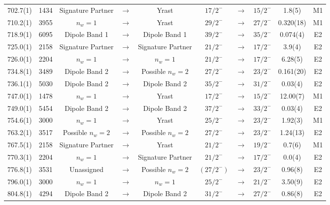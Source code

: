 \begin{landscape}
\begin{center}
\begin{longtable}{|c|c|ccc|ccc|c|c|}
 702.7(1) & 1434 & Signature Partner & $ \rightarrow $ & Yrast & $ 17/2^{-} $ & $ \rightarrow $ & $ 15/2^{-} $ & 1.8(5) & M1 \\
 710.2(1) & 3955 & $n_w=1$ & $ \rightarrow $ & Yrast & $ 29/2^{-} $ & $ \rightarrow $ & $ 27/2^{-} $ & 0.320(18) & M1 \\
 718.9(1) & 6095 & Dipole Band 1 & $ \rightarrow $ & Dipole Band 1 & $ 39/2^{-} $ & $ \rightarrow $ & $ 35/2^{-} $ & 0.074(4) & E2 \\
 725.0(1) & 2158 & Signature Partner & $ \rightarrow $ & Signature Partner & $ 21/2^{-} $ & $ \rightarrow $ & $ 17/2^{-} $ & 3.9(4) & E2 \\
 726.0(1) & 2204 & $n_w=1$ & $ \rightarrow $ & $n_w=1$ & $ 21/2^{-} $ & $ \rightarrow $ & $ 17/2^{-} $ & 6.28(5) & E2 \\
 734.8(1) & 3489 & Dipole Band 2 & $ \rightarrow $ & Possible $n_w=2$ & $ 27/2^{-} $ & $ \rightarrow $ & $ 23/2^{-} $ & 0.161(20) & E2 \\
 736.1(1) & 5030 & Dipole Band 2 & $ \rightarrow $ & Dipole Band 2 & $ 35/2^{-} $ & $ \rightarrow $ & $ 31/2^{-} $ & 0.03(4) & E2 \\
 747.0(1) & 1478 & $n_w=1$ & $ \rightarrow $ & Yrast & $ 17/2^{-} $ & $ \rightarrow $ & $ 15/2^{-} $ & 12.00(7) & M1 \\
 749.0(1) & 5454 & Dipole Band 2 & $ \rightarrow $ & Dipole Band 2 & $ 37/2^{-} $ & $ \rightarrow $ & $ 33/2^{-} $ & 0.03(4) & E2 \\
 754.6(1) & 3000 & $n_w=1$ & $ \rightarrow $ & Yrast & $ 25/2^{-} $ & $ \rightarrow $ & $ 23/2^{-} $ & 1.92(3) & M1 \\
 763.2(1) & 3517 & Possible $n_w=2$ & $ \rightarrow $ & Possible $n_w=2$ & $ 27/2^{-} $ & $ \rightarrow $ & $ 23/2^{-} $ & 1.24(13) & E2 \\
 767.5(1) & 2158 & Signature Partner & $ \rightarrow $ & Yrast & $ 21/2^{-} $ & $ \rightarrow $ & $ 19/2^{-} $ & 0.7(6) & M1 \\
 770.3(1) & 2204 & $n_w=1$ & $ \rightarrow $ & Signature Partner & $ 21/2^{-} $ & $ \rightarrow $ & $ 17/2^{-} $ & 0.0(4) & E2 \\
 776.8(1) & 3531 & Unassigned & $ \rightarrow $ & Possible $n_w=2$ & $ (27/2^{-}) $ & $ \rightarrow $ & $ 23/2^{-} $ & 0.96(8) & E2 \\
 796.0(1) & 3000 & $n_w=1$ & $ \rightarrow $ & $n_w=1$ & $ 25/2^{-} $ & $ \rightarrow $ & $ 21/2^{-} $ & 3.50(9) & E2 \\
 804.8(1) & 4294 & Dipole Band 2 & $ \rightarrow $ & Dipole Band 2 & $ 31/2^{-} $ & $ \rightarrow $ & $ 27/2^{-} $ & 0.86(8) & E2 \\

\end{longtable}
\end{center}
\end{landscape}
